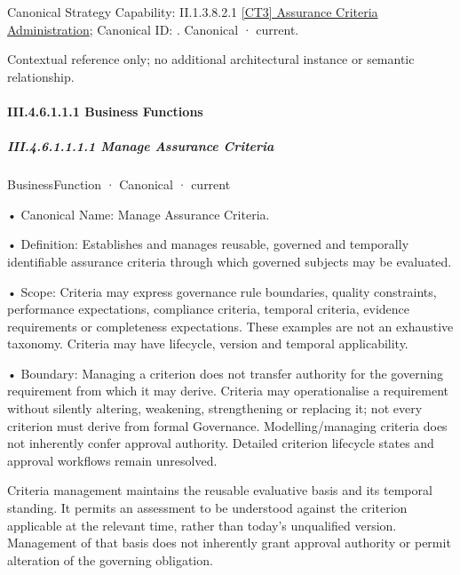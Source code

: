{\small Canonical Strategy Capability: II.1.3.8.2.1 \hyperref[element:1bfd71f24321428c8871b587d413f47e]{[CT3] Assurance Criteria Administration}; Canonical ID: \texttt{}. Canonical · current.}\par
Contextual reference only; no additional architectural instance or semantic relationship.\par
\paragraph*{III.4.6.1.1.1 Business Functions}
\label{navigation:III.4.6.1.1.1}

\subparagraph*{III.4.6.1.1.1.1 Manage Assurance Criteria}
\label{navigation:III.4.6.1.1.1.1}

\label{element:d7e9ba5addd94db2bce164c7c9809e4e}
{\small BusinessFunction · Canonical · current}\par

•
Canonical Name: Manage Assurance Criteria.



•
Definition: Establishes and manages reusable, governed and temporally identifiable assurance criteria through which governed subjects may be evaluated.



•
Scope: Criteria may express governance rule boundaries, quality constraints, performance expectations, compliance criteria, temporal criteria, evidence requirements or completeness expectations. These examples are not an exhaustive taxonomy. Criteria may have lifecycle, version and temporal applicability.



•
Boundary: Managing a criterion does not transfer authority for the governing requirement from which it may derive. Criteria may operationalise a requirement without silently altering, weakening, strengthening or replacing it; not every criterion must derive from formal Governance. Modelling/managing criteria does not inherently confer approval authority. Detailed criterion lifecycle states and approval workflows remain unresolved.



Criteria management maintains the reusable evaluative basis and its temporal standing. It permits an assessment to be understood against the criterion applicable at the relevant time, rather than today's unqualified version. Management of that basis does not inherently grant approval authority or permit alteration of the governing obligation.


